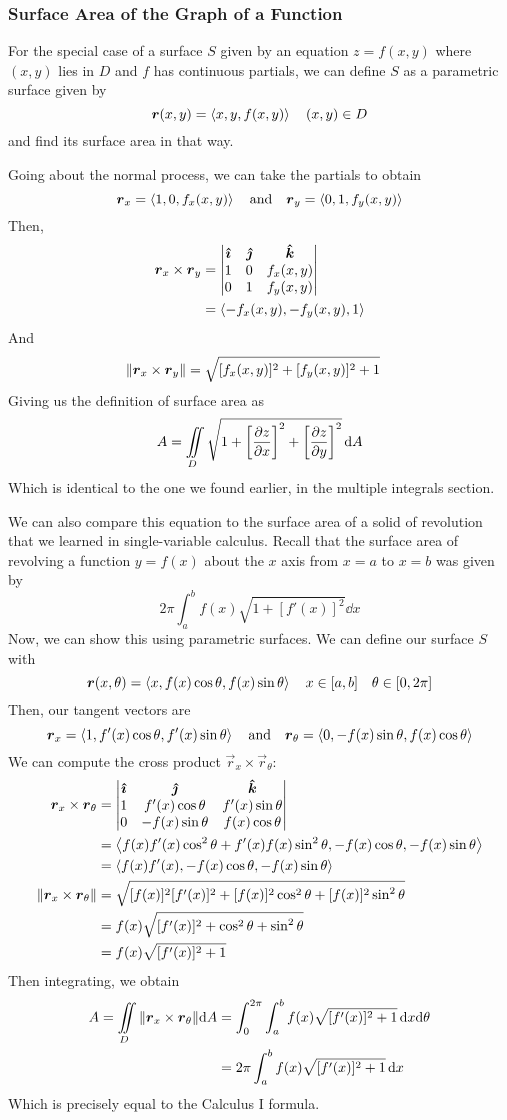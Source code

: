 \subsubsection{Surface Area of the Graph of a Function}
For the special case of a surface $S$ given by an equation $z=f(x,y)$ where $(x,y)$ lies in $D$ and $f$ has continuous partials, we can define $S$ as a parametric surface given by
\[ \boldsymbol{r}(x,y) = \left\langle x, y, f(x,y)\right\rangle \quad (x,y)\in D\]
and find its surface area in that way. \par
Going about the normal process, we can take the partials to obtain
\[ \boldsymbol{r}_x = \left\langle1, 0, f_x(x,y)\right\rangle \quad \text{and} \quad \boldsymbol{r}_y = \left\langle0, 1, f_y(x,y)\right\rangle\]
Then,
\begin{align*}
    \boldsymbol{r}_x \times \boldsymbol{r}_y &= \begin{vmatrix} \boldsymbol{\hat{\imath}} & \boldsymbol{\hat{\jmath}} & \boldsymbol{\hat{k}} \\ 1 & 0 & f_x(x,y) \\ 0 & 1 & f_y(x,y)\end{vmatrix} \\
    &= \left\langle -f_x(x,y), -f_y(x,y), 1\right\rangle
\end{align*}
And
\begin{align*}
    \norm{\boldsymbol{r}_x\times\boldsymbol{r}_y} &= \sqrt{[f_x(x,y)]^2+[f_y(x,y)]^2+1}
\end{align*}
Giving us the definition of surface area as
\[ A = \iint\limits_D \sqrt{1 + \bqty{\pdv{z}{x}}^2+\bqty{\pdv{z}{y}}^2}\, \dd A\]
Which is identical to the one we found earlier, in the multiple integrals section. \par
We can also compare this equation to the surface area of a solid of revolution that we learned in single-variable calculus. Recall that the surface area of revolving a function $y = f(x)$ about the $x$ axis from $x=a$ to $x=b$ was given by 
\[ 2\pi \int_a^b f(x)\sqrt{1+[f'(x)]^2}\dd x\]
Now, we can show this using parametric surfaces. We can define our surface $S$ with 
\[ \boldsymbol{r}(x, \theta) = \left\langle x, f(x)\cos\theta, f(x)\sin\theta \right\rangle \quad x\in[a,b]\quad \theta\in[0,2\pi]\]
Then, our tangent vectors are
\[ \boldsymbol{r}_x = \left\langle 1, f'(x)\cos\theta, f'(x)\sin\theta\right\rangle \quad\text{and}\quad \boldsymbol{r}_\theta = \left\langle0, -f(x)\sin\theta, f(x)\cos\theta\right\rangle\]
We can compute the cross product $\vec r_x \times \vec r_\theta$:
\begin{align*}
    \boldsymbol{r}_x\times\boldsymbol{r}_\theta &= \begin{vmatrix} \boldsymbol{\hat{\imath}} & \boldsymbol{\hat{\jmath}} & \boldsymbol{\hat{k}} \\ 1 & f'(x)\cos\theta & f'(x)\sin\theta \\ 0 & -f(x)\sin\theta & f(x)\cos\theta\end{vmatrix} \\
    &= \left\langle f(x)f'(x)\cos^2\theta + f'(x)f(x)\sin^2\theta, -f(x)\cos\theta, -f(x)\sin\theta\right\rangle \\
    &= \left\langle f(x)f'(x),-f(x)\cos\theta, -f(x)\sin\theta\right\rangle \\
    \norm{\boldsymbol{r}_x\times\boldsymbol{r}_\theta} &= \sqrt{[f(x)]^2[f'(x)]^2 + [f(x)]^2\cos^2\theta + [f(x)]^2\sin^2\theta} \\
    &= f(x)\sqrt{[f'(x)]^2 + \cos^2\theta + \sin^2\theta} \\
    &= f(x)\sqrt{[f'(x)]^2+1}
\end{align*}
Then integrating, we obtain
\begin{align*}
    A = \iint\limits_D \norm{\boldsymbol{r}_x\times\boldsymbol{r}_\theta}\dd A &= \int_0^{2\pi}\int_a^b f(x)\sqrt{[f'(x)]^2+1}\,\dd x\dd \theta \\
    &= 2\pi \int_a^b f(x)\sqrt{[f'(x)]^2+1}\,\dd x
\end{align*}
Which is precisely equal to the Calculus I formula.
